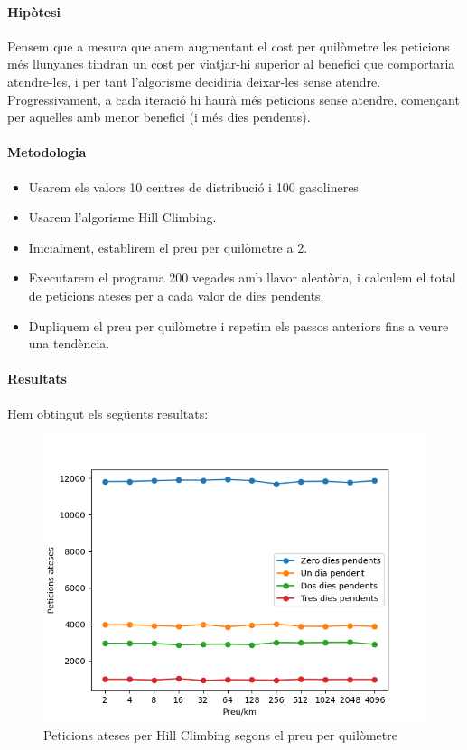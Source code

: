 \documentclass[a4paper]{article}
\begin{document}
\paragraph{Hipòtesi} Pensem que a mesura que anem augmentant el cost per quilòmetre les peticions més llunyanes tindran un cost per viatjar-hi superior al benefici que comportaria atendre-les, i per tant l'algorisme decidiria deixar-les sense atendre. Progressivament, a cada iteració hi haurà més peticions sense atendre, començant per aquelles amb menor benefici (i més dies pendents).
\paragraph{Metodologia}
\begin{itemize}
\item Usarem els valors 10 centres de distribució i 100 gasolineres
\item Usarem l'algorisme Hill Climbing.
\item Inicialment, establirem el preu per quilòmetre a 2.
\item Executarem el programa 200 vegades amb llavor aleatòria, i calculem el total de peticions ateses per a cada valor de dies pendents.
\item Dupliquem el preu per quilòmetre i repetim els passos anteriors fins a veure una tendència.
\end{itemize}

\paragraph{Resultats} Hem obtingut els següents resultats:

\begin{figure}[htp]
\centering
\includegraphics[scale=0.65]{images/experiment6.png}
\caption{Peticions ateses per Hill Climbing segons el preu per quilòmetre}
\centering
\end{figure}
\end{document}
